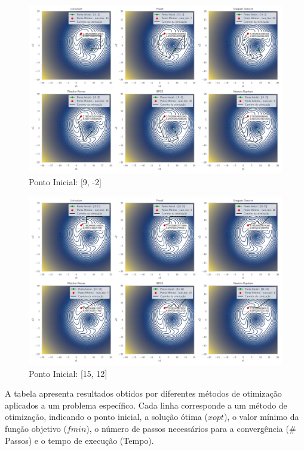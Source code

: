\documentclass[12pt]{article}
\begin{document}
\begin{figure}[H]
  \centering
  \caption{Ponto Inicial: [9, -2]}
  \includegraphics[scale=0.4]{img/questao_2_[ 9 -2].pdf}
\end{figure}

\begin{figure}[H]
  \centering
  \caption{Ponto Inicial: [15, 12]}
  \includegraphics[scale=0.4]{img/questao_2_[15 12].pdf}
\end{figure}

A tabela apresenta resultados obtidos por diferentes métodos de otimização aplicados a um problema específico. Cada linha corresponde a um método de otimização, indicando o ponto inicial, a solução ótima ($xopt$), o valor mínimo da função objetivo ($fmin$), o número de passos necessários para a convergência (\# Passos) e o tempo de execução (Tempo).
\end{document}
